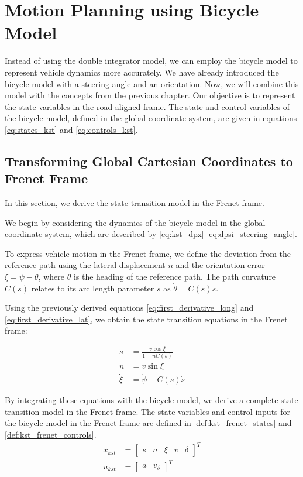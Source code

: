 \section{Motion Planning using Bicycle Model} \label{sec:motion_planning_using_bicylce}
Instead of using the double integrator model, we can employ the bicycle model to represent vehicle dynamics more accurately.
We have already introduced the bicycle model with a steering angle and an orientation.
Now, we will combine this model with the concepts from the previous chapter.
Our objective is to represent the state variables in the road-aligned frame.
The state and control variables of the bicycle model, defined in the global coordinate system, are given in equations \eqref{eq:states_kst} and
\eqref{eq:controls_kst}.

\subsection{Transforming Global Cartesian Coordinates to Frenet Frame} \label{subsec:bicycle_conversion_of_cartesian_to_frenet}

In this section, we derive the state transition model in the Frenet frame.

We begin by considering the dynamics of the bicycle model in the global coordinate system, which are described by
\eqref{eq:kst_dpx}-\eqref{eq:dpsi_steering_angle}.

To express vehicle motion in the Frenet frame, we define the deviation from the reference path using the lateral displacement $n$ and the orientation
error $\xi = \psi - \theta$, where $\theta$ is the heading of the reference path.
The path curvature $C(s)$ relates to its arc length parameter $s$ as $\dot{\theta} = C(s) \dot{s}$.

Using the previously derived equations \eqref{eq:first_derivative_long} and \eqref{eq:first_derivative_lat}, we obtain the state transition equations in the Frenet frame:

\begin{align} \dot{s} &= \frac{v\cos\xi}{1 - nC(s)} \\ \dot{n} &= v\sin\xi \\ \dot{\xi} &= \dot{\psi} - C(s)\dot{s} \end{align}

By integrating these equations with the bicycle model, we derive a complete state transition model in the Frenet frame.
The state variables and control inputs for the bicycle model in the Frenet frame are defined in \eqref{def:kst_frenet_states} and
\eqref{def:kst_frenet_controls}.
\begin{align}
	x_{kst} & = \begin{bmatrix}
		            s & n & \xi & v & \delta
	            \end{bmatrix}^T
	\label{def:kst_frenet_states}        \\[10pt]
	u_{kst} & = \begin{bmatrix}
		            a & v_\delta
	            \end{bmatrix}^T
	\label{def:kst_frenet_controls}
\end{align}

